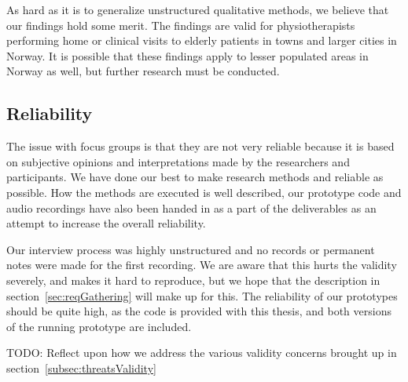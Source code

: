 As hard as it is to generalize unstructured qualitative methods, we believe that our findings hold some merit. The findings are valid for physiotherapists performing home or clinical visits to elderly patients in towns and larger cities in Norway. It is possible that these findings apply to lesser populated areas in Norway as well, but further research must be conducted.

\subsection{Reliability}
The issue with focus groups is that they are not very reliable because it is based on subjective opinions and interpretations made by the researchers and participants. We have done our best to make research methods and reliable as possible. How the methods are executed is well described, our prototype code and audio recordings have also been handed in as a part of the deliverables as an attempt to increase the overall reliability.

Our interview process was highly unstructured and no records or permanent notes were made for the first recording. We are aware that this hurts the validity severely, and makes it hard to reproduce, but we hope that the description in section~\ref{sec:reqGathering} will make up for this. The reliability of our prototypes should be quite high, as the code is provided with this thesis, and both versions of the running prototype are included.


TODO: Reflect upon how we address the various validity concerns brought up in section~\ref{subsec:threatsValidity}
